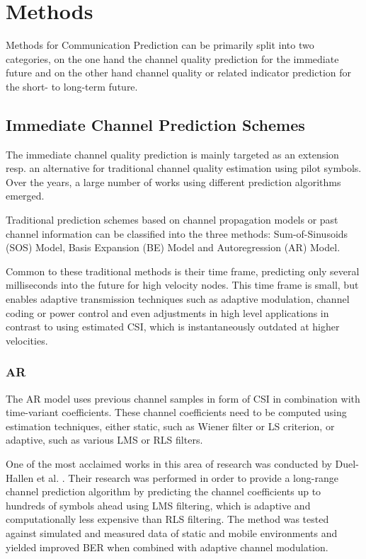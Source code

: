 \documentclass{IEEEtran}
\begin{document}
\section{Methods}
Methods for Communication Prediction can be primarily split into two categories, on the one hand the channel quality prediction for the immediate future and on the other hand channel quality or related indicator prediction for the short- to long-term future.

\subsection{Immediate Channel Prediction Schemes}
The immediate channel quality prediction is mainly targeted as an extension resp. an alternative for traditional channel quality estimation using pilot symbols.
Over the years, a large number of works using different prediction algorithms emerged. 

Traditional prediction schemes based on channel propagation models or past channel information can be classified into the three methods: Sum-of-Sinusoids (SOS) Model, Basis Expansion (BE) Model and Autoregression (AR) Model.

Common to these traditional methods is their time frame, predicting only several milliseconds into the future for high velocity nodes. This time frame is small, but enables adaptive transmission techniques such as adaptive modulation, channel coding or power control and even adjustments in high level applications in contrast to using estimated CSI, which is instantaneously outdated at higher velocities.

\subsubsection{AR}
The AR model uses previous channel samples in form of CSI in combination with time-variant coefficients. These channel coefficients need to be computed using estimation techniques, either static, such as Wiener filter or LS criterion, or adaptive, such as various LMS or RLS filters.

One of the most acclaimed works in this area of research was conducted by Duel-Hallen et al. \cite{duel-hallenLongrangePredictionFading2000}. Their research was performed in order to provide a long-range channel prediction algorithm by predicting the channel coefficients up to hundreds of symbols ahead using LMS filtering, which is adaptive and computationally less expensive than RLS filtering.
The method was tested against simulated and measured data of static and mobile environments and yielded improved BER when combined with adaptive channel modulation.
\end{document}
